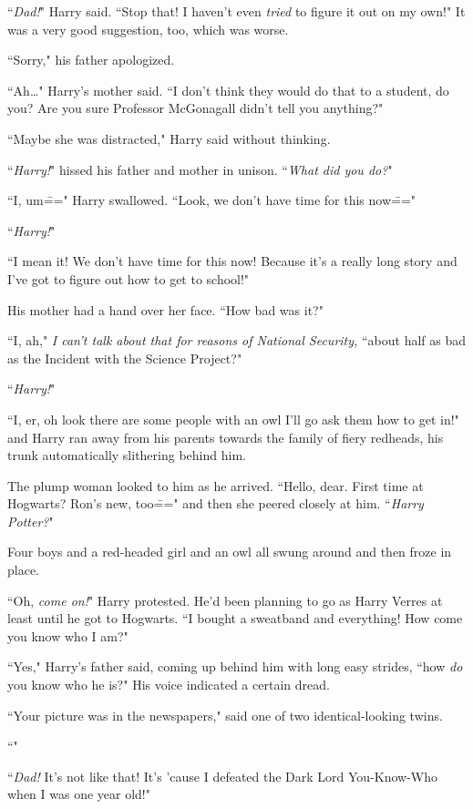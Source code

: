 ``\emph{Dad!}" Harry said. ``Stop that! I haven't even \emph{tried} to figure it out on my own!" It was a very good suggestion, too, which was worse.

``Sorry," his father apologized.

``Ah{\ldots}" Harry's mother said. ``I don't think they would do that to a student, do you? Are you sure Professor McGonagall didn't tell you anything?"

``Maybe she was distracted," Harry said without thinking.

``\emph{Harry!}" hissed his father and mother in unison. ``\emph{What did you do?}"

``I, um\===" Harry swallowed. ``Look, we don't have time for this now\==="

``\emph{Harry!}"

``I mean it! We don't have time for this now! Because it's a really long story and I've got to figure out how to get to school!"

His mother had a hand over her face. ``How bad was it?"

``I, ah," \emph{I can't talk about that for reasons of National Security,} ``about half as bad as the Incident with the Science Project?"

``\emph{Harry!}"

``I, er, oh look there are some people with an owl I'll go ask them how to get in!" and Harry ran away from his parents towards the family of fiery redheads, his trunk automatically slithering behind him.

The plump woman looked to him as he arrived. ``Hello, dear. First time at Hogwarts? Ron's new, too\===" and then she peered closely at him. ``\emph{Harry Potter?}"

Four boys and a red-headed girl and an owl all swung around and then froze in place.

``Oh, \emph{come on!}" Harry protested. He'd been planning to go as Harry Verres at least until he got to Hogwarts. ``I bought a sweatband and everything! How come you know who I am?"

``Yes," Harry's father said, coming up behind him with long easy strides, ``how \emph{do} you know who he is?" His voice indicated a certain dread.

``Your picture was in the newspapers," said one of two identical-looking twins.

``"

``\emph{Dad!} It's not like that! It's 'cause I defeated the Dark Lord You-Know-Who when I was one year old!"


